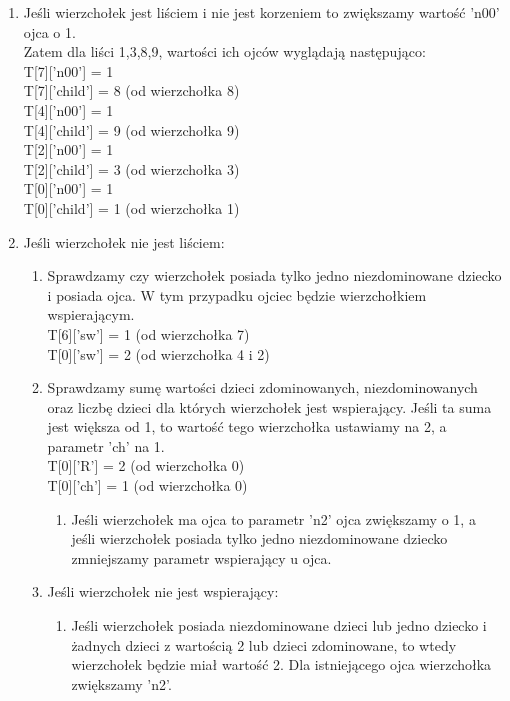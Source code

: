 \begin{enumerate}
    \item Jeśli wierzchołek jest liściem i nie jest korzeniem to zwiększamy wartość 'n00' ojca o 1.\\
    Zatem dla liści 1,3,8,9, wartości ich ojców wyglądają następująco:\\
        T[7]['n00'] = 1  \\
        T[7]['child'] = 8  (od wierzchołka 8)\\
        T[4]['n00'] = 1 \\
        T[4]['child'] = 9  (od wierzchołka 9)\\
        T[2]['n00'] = 1  \\
        T[2]['child'] = 3  (od wierzchołka 3)\\
        T[0]['n00'] = 1 \\
        T[0]['child'] = 1  (od wierzchołka 1)\\
    \item Jeśli wierzchołek nie jest liściem:
    \begin{enumerate}
        \item Sprawdzamy czy wierzchołek posiada tylko jedno niezdominowane dziecko i posiada ojca. W tym przypadku ojciec będzie wierzchołkiem wspierającym. \\
        T[6]['sw'] = 1 (od wierzchołka 7)\\
        T[0]['sw'] = 2 (od wierzchołka 4 i 2)\\
        \item Sprawdzamy sumę wartości dzieci zdominowanych, niezdominowanych oraz liczbę dzieci dla których wierzchołek jest wspierający. Jeśli ta suma jest większa od 1, to wartość tego wierzchołka ustawiamy na 2, a parametr 'ch' na 1.\\
        T[0]['R'] = 2  (od wierzchołka 0)\\
        T[0]['ch'] = 1  (od wierzchołka 0)\\
        \begin{enumerate}
            \item Jeśli wierzchołek ma ojca to parametr 'n2' ojca zwiększamy o 1, a jeśli wierzchołek posiada tylko jedno niezdominowane dziecko zmniejszamy parametr wspierający u ojca.
        \end{enumerate}
        \item Jeśli wierzchołek nie jest wspierający:
            \begin{enumerate}
                \item Jeśli wierzchołek posiada niezdominowane dzieci lub jedno dziecko i żadnych dzieci z wartością 2 lub dzieci zdominowane, to wtedy wierzchołek będzie miał wartość 2. Dla istniejącego ojca wierzchołka zwiększamy 'n2'.\\

\end{enumerate}
\end{enumerate}
\end{enumerate}
